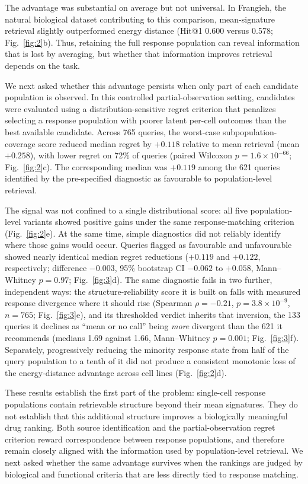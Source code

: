 \documentclass[11pt,letterpaper]{article}
\newcommand{\GATEREC}{+0.119}           %
\newcommand{\GATENONREC}{+0.122}        %
\newcommand{\GATEDIFF}{-0.003}
\newcommand{\GATEDIFFCI}{$-0.062$ to $+0.058$}
\newcommand{\GATEDIFFP}{0.97}
\begin{document}
The advantage was substantial on average but not universal. In Frangieh\cite{dataFrangieh}, the natural biological dataset contributing to this comparison, mean-signature retrieval slightly outperformed energy distance (Hit@1 0.600 versus 0.578; Fig.~\ref{fig:2}b). Thus, retaining the full response population can reveal information that is lost by averaging, but whether that information improves retrieval depends on the task.

We next asked whether this advantage persists when only part of each candidate population is observed. In this controlled partial-observation setting, candidates were evaluated using a distribution-sensitive regret criterion that penalizes selecting a response population with poorer latent per-cell outcomes than the best available candidate. Across 765 queries, the worst-case subpopulation-coverage score reduced median regret by $+0.118$ relative to mean retrieval (mean $+0.258$), with lower regret on 72\% of queries (paired Wilcoxon $p=1.6\times10^{-66}$; Fig.~\ref{fig:2}c). The corresponding median was $+0.119$ among the 621 queries identified by the pre-specified diagnostic as favourable to population-level retrieval.

The signal was not confined to a single distributional score: all five population-level variants showed positive gains under the same response-matching criterion (Fig.~\ref{fig:2}e). At the same time, simple diagnostics did not reliably identify where those gains would occur. Queries flagged as favourable and unfavourable showed nearly identical median regret reductions ($\GATEREC$ and $\GATENONREC$, respectively; difference $\GATEDIFF$, 95\% bootstrap CI \GATEDIFFCI, Mann--Whitney $p=\GATEDIFFP$; Fig.~\ref{fig:3}d). The same diagnostic fails in two further, independent ways: the structure-reliability score it is built on falls with measured response divergence where it should rise (Spearman $\rho=-0.21$, $p=3.8\times10^{-9}$, $n=765$; Fig.~\ref{fig:3}e), and its thresholded verdict inherits that inversion, the 133 queries it declines as ``mean or no call'' being \emph{more} divergent than the 621 it recommends (medians 1.69 against 1.66, Mann--Whitney $p=0.001$; Fig.~\ref{fig:3}f). Separately, progressively reducing the minority response state from half of the query population to a tenth of it did not produce a consistent monotonic loss of the energy-distance advantage across cell lines (Fig.~\ref{fig:2}d).

These results establish the first part of the problem: single-cell response populations contain retrievable structure beyond their mean signatures. They do not establish that this additional structure improves a biologically meaningful drug ranking. Both source identification and the partial-observation regret criterion reward correspondence between response populations, and therefore remain closely aligned with the information used by population-level retrieval. We next asked whether the same advantage survives when the rankings are judged by biological and functional criteria that are less directly tied to response matching.
\end{document}
